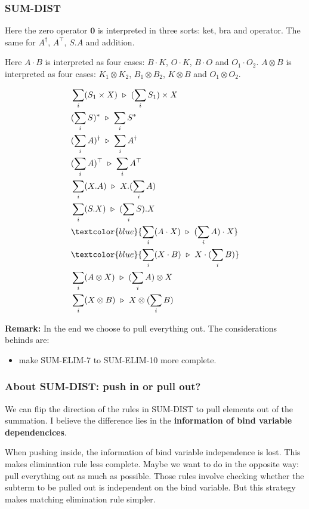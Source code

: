 \subsubsection*{\textsf{SUM-DIST}}
Here the zero operator $\mathbf{0}$ is interpreted in three sorts: ket, bra and operator. The same for $A^\dagger$, $A^\top$, $S.A$ and addition.

Here $A \cdot B$ is interpreted as four cases: $B \cdot K$, $O \cdot K$, $B \cdot O$ and $O_1 \cdot O_2$. $A \otimes B$ is interpreted as four cases: $K_1 \otimes K_2$, $B_1 \otimes B_2$, $K \otimes B$ and $O_1 \otimes O_2$.

\begin{align*}
  & \sum_i (S_1 \times X) \reduce (\sum_i S_1) \times X \\
  & (\sum_i S)^* \reduce \sum_i S^* \\
  & (\sum_i A)^\dagger \reduce \sum_i A^\dagger \\
  & (\sum_i A)^\top \reduce \sum_i A^\top \\
  & \sum_i (X.A) \reduce X.(\sum_i A) \\
  & \sum_i (S.X) \reduce (\sum_i S). X \\
  & \textcolor{blue}{\sum_i (A \cdot X) \reduce (\sum_i A) \cdot X} \\
  & \textcolor{blue}{\sum_i (X \cdot B) \reduce X \cdot (\sum_i B)} \\
  & \sum_i (A \otimes X) \reduce (\sum_i A) \otimes X \\
  & \sum_i (X \otimes B) \reduce X \otimes (\sum_i B)
\end{align*}

\textbf{Remark:} In the end we choose to pull everything out. The considerations behinds are:
\begin{itemize}
  \item make \textsf{SUM-ELIM-7} to \textsf{SUM-ELIM-10} more complete.
\end{itemize}


\subsubsection*{About \textsf{SUM-DIST}: push in or pull out?}
We can flip the direction of the rules in \textsf{SUM-DIST} to pull elements out of the summation. I believe the difference lies in the \textbf{information of bind variable dependencices}.

When pushing inside, the information of bind variable independence is lost. This makes elimination rule less complete. Maybe we want to do in the opposite way: pull everything out as much as possible. Those rules involve checking whether the subterm to be pulled out is independent on the bind variable. But this strategy makes matching elimination rule simpler.


